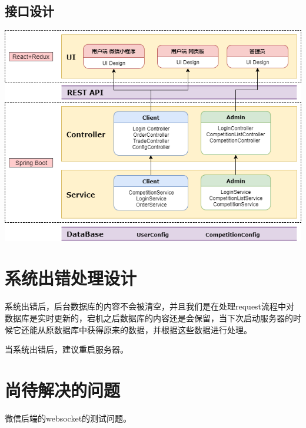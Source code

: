 \documentclass{article}
\begin{document}
            \subsection{接口设计}
                \includegraphics[scale = .3]{fig/架构图.png}
        \section{系统出错处理设计}
            系统出错后，后台数据库的内容不会被清空，并且我们是在处理request流程中对数据库是实时更新的，宕机之后数据库的内容还是会保留，当下次启动服务器的时候它还能从原数据库中获得原来的数据，并根据这些数据进行处理。

            当系统出错后，建议重启服务器。
        \section{尚待解决的问题}
            微信后端的websocket的测试问题。
\end{document}
